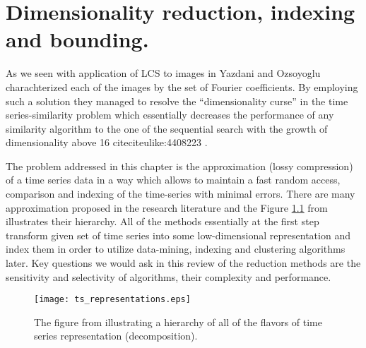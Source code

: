 \chapter{Dimensionality reduction, indexing and bounding.}
As we seen with application of LCS to images in \cite{citeulike:4367061} Yazdani and Ozsoyoglu charachterized each of the images by the set of Fourier coefficients. By employing such a solution they managed to resolve the ``dimensionality curse'' in the time series-similarity problem which essentially decreases the performance of any similarity algorithm to the one of the sequential search with the growth of dimensionality above 16 cite{citeulike:4408223} \cite{citeulike:4384496} \cite{citeulike:2843857} \cite{citeulike:4384489} \cite{citeulike:343069}.

The problem addressed in this chapter is the approximation (lossy compression) of a time series data in a way which allows to maintain a fast random access, comparison and indexing of the time-series with minimal errors. There are many approximation proposed in the research literature and the Figure \ref{fig:approximations} from \cite{citeulike:2821475} illustrates their hierarchy. All of the methods essentially at the first step transform given set of time series into some low-dimensional representation and index them in order to utilize data-mining, indexing and clustering algorithms later. Key questions we would ask in this review of the reduction methods are the sensitivity and selectivity of algorithms, their complexity and performance.

\begin{figure}[tbp]
   \centering
   \texttt{[image: ts\_representations.eps]}
   \caption{The figure from \cite{citeulike:2821475} illustrating a hierarchy of all of the flavors of time series representation (decomposition).}
   \label{fig:approximations}
\end{figure} 
